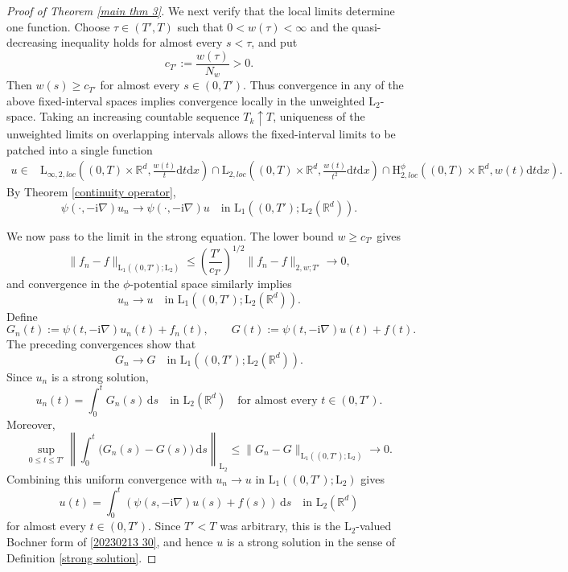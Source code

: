 \documentclass[11pt,reqno]{amsart}
\theoremstyle{definition}
\theoremstyle{remark}
\newcommand\bR{\mathbb{R}}
\numberwithin{equation}{section}
\begin{document}
\begin{proof}[Proof of Theorem \ref{main thm 3}]
We next verify that the local limits determine one function. Choose
$\tau\in(T',T)$ such that $0<w(\tau)<\infty$ and the quasi-decreasing
inequality holds for almost every $s<\tau$, and put
$$
c_{T'}:=\frac{w(\tau)}{N_w}>0.
$$
Then $w(s)\geq c_{T'}$ for almost every $s\in(0,T')$. Thus convergence
in any of the above fixed-interval spaces implies convergence locally
in the unweighted $\mathrm L_2$-space. Taking an increasing countable
sequence $T_k\uparrow T$, uniqueness of the unweighted limits on
overlapping intervals allows the fixed-interval limits to be patched
into a single function
$$
\begin{aligned}
u\in{}&
\mathrm{L}_{\infty,2,loc}
\left((0,T)\times\bR^d,\frac{w(t)}{t}\mathrm{d}t\mathrm{d}x\right)
\cap
\mathrm{L}_{2,loc}
\left((0,T)\times\bR^d,\frac{w(t)}{t^2}\mathrm{d}t\mathrm{d}x\right)\cap
\mathrm{H}_{2,loc}^{\phi}
\left((0,T)\times\bR^d,w(t)\mathrm{d}t\mathrm{d}x\right).
\end{aligned}
$$
By Theorem \ref{continuity operator},
$$
\psi(\cdot,-\mathrm{i}\nabla)u_n
\longrightarrow
\psi(\cdot,-\mathrm{i}\nabla)u
\quad\text{in }\mathrm L_1\left((0,T');\mathrm L_2(\bR^d)\right).
$$

We now pass to the limit in the strong equation. The lower bound
$w\geq c_{T'}$ gives
$$
\|f_n-f\|_{\mathrm L_1((0,T');\mathrm L_2)}
\leq
\left(\frac{T'}{c_{T'}}\right)^{1/2}
\|f_n-f\|_{2,w;T'}
\longrightarrow0,
$$
and convergence in the $\phi$-potential space similarly implies
$$
u_n\longrightarrow u
\quad\text{in }\mathrm L_1\left((0,T');\mathrm L_2(\bR^d)\right).
$$
Define
$$
G_n(t):=\psi(t,-\mathrm{i}\nabla)u_n(t)+f_n(t),
\qquad
G(t):=\psi(t,-\mathrm{i}\nabla)u(t)+f(t).
$$
The preceding convergences show that
$$
G_n\longrightarrow G
\quad\text{in }\mathrm L_1\left((0,T');\mathrm L_2(\bR^d)\right).
$$
Since $u_n$ is a strong solution,
$$
u_n(t)=\int_0^tG_n(s)\,\mathrm{d}s
\quad\text{in }\mathrm L_2(\bR^d)
\quad\text{for almost every }t\in(0,T').
$$
Moreover,
$$
\sup_{0\leq t\leq T'}
\left\|
\int_0^t\bigl(G_n(s)-G(s)\bigr)\,\mathrm{d}s
\right\|_{\mathrm L_2}
\leq
\|G_n-G\|_{\mathrm L_1((0,T');\mathrm L_2)}
\longrightarrow0.
$$
Combining this uniform convergence with
$u_n\to u$ in $\mathrm L_1((0,T');\mathrm L_2)$ gives
$$
u(t)
=
\int_0^t
\left(
\psi(s,-\mathrm{i}\nabla)u(s)+f(s)
\right)\,\mathrm{d}s
\quad\text{in }\mathrm L_2(\bR^d)
$$
for almost every $t\in(0,T')$. Since $T'<T$ was arbitrary, this is the
$\mathrm L_2$-valued Bochner form of \eqref{20230213 30}, and hence
$u$ is a strong solution in the sense of Definition
\ref{strong solution}.


\end{proof}
\end{document}
